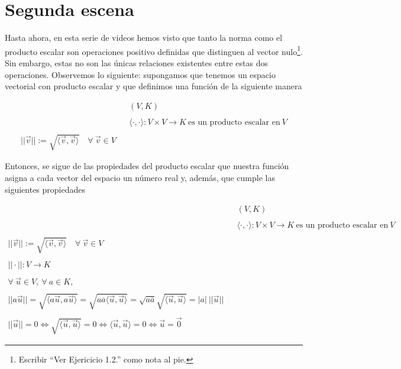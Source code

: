 \documentclass[12pt,dvipsnames]{article}
\numberwithin{equation}{section}
\begin{document}

\newpage
\section{Segunda escena}

Hasta ahora, en esta serie de videos hemos visto que tanto la norma como el producto escalar son operaciones positivo definidas que distinguen al vector nulo\footnote{Escribir ``Ver Ejericicio 1.2.'' como nota al pie.}. Sin embargo, estas no son las únicas relaciones existentes entre estas dos operaciones. Observemos lo siguiente: supongamos que tenemos un espacio vectorial con producto escalar y que definimos una función de la siguiente manera

\begin{align*}
    & &(V,K) \\
    \\
    & &\langle \cdot , \cdot \rangle : V\times V\to K \ \text{es un producto escalar en} \ V\\
    \\
    ||\vec{v}||:=\sqrt{\langle \vec{v} , \vec{v} \rangle} \quad \forall \ \vec{v}\in V
\end{align*}

Entonces, se sigue de las propiedades del producto escalar que nuestra función asigna a cada vector del espacio un número real y, además, que cumple las siguientes propiedades

\begin{align*}
    & &(V,K) \\
    \\
    & &\langle \cdot , \cdot \rangle : V\times V\to K \ \text{es un producto escalar en} \ V\\
    \\
    ||\vec{v}||:=\sqrt{\langle \vec{v} , \vec{v} \rangle} \quad \forall \ \vec{v}\in V\\
    \\
    ||\cdot||:V\to K\\
    \\
    \forall \ \vec{u}\in V, \ \forall \ a\in K,\\
    \\
    ||a\vec{u}|| = \sqrt{\langle a\vec{u} , a\vec{u} \rangle} = \sqrt{a\overline{a}\langle \vec{u} , \vec{u} \rangle} = \sqrt{a\overline{a}} \sqrt{\langle \vec{u} , \vec{u} \rangle} = |a| \ ||\vec{u}||\\
    \\
    ||\vec{u}|| = 0 \iff \sqrt{\langle \vec{u} , \vec{u} \rangle} = 0 \iff \langle \vec{u} , \vec{u} \rangle = 0 \iff \vec{u} = \vec{0}
\end{align*}
\end{document}
